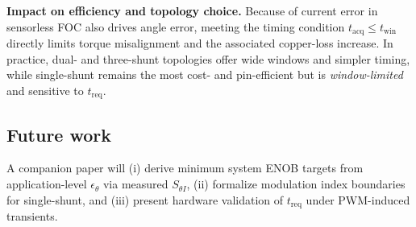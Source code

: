 \documentclass[conference]{IEEEtran}
\begin{document}
\medskip
\noindent\textbf{Impact on efficiency and topology choice.}
Because of current error in sensorless FOC also drives angle error, meeting the timing condition \(t_{\mathrm{acq}}\!\le\!t_{\mathrm{win}}\) directly limits torque misalignment and the associated copper-loss increase. In practice, dual- and three-shunt topologies offer wide windows and simpler timing, while single-shunt remains the most cost- and pin-efficient but is \emph{window-limited} and sensitive to \(t_{\mathrm{req}}\).

\subsection*{Future work}
A companion paper will (i) derive minimum system ENOB targets from application-level \(\epsilon_\theta\) via measured \(S_{\theta I}\), (ii) formalize modulation index boundaries for single-shunt, and (iii) present hardware validation of \(t_{\mathrm{req}}\) under PWM-induced transients.





\end{document}

